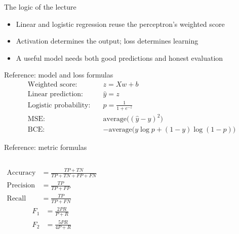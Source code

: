 \documentclass[aspectratio=169,11pt]{beamer}
\begin{document}
\begin{frame}{The logic of the lecture}
  \begin{center}
  \end{center}
  \vspace{.65cm}
  \begin{itemize}
    \item Linear and logistic regression reuse the perceptron's weighted score
    \item Activation determines the output; loss determines learning
    \item A useful model needs both good predictions and honest evaluation
  \end{itemize}
\end{frame}

\appendix
\begin{frame}{Reference: model and loss formulas}
  \begin{align*}
    \text{Weighted score:}\quad&z=Xw+b\\[4pt]
    \text{Linear prediction:}\quad&\hat y=z\\[4pt]
    \text{Logistic probability:}\quad&p=\frac{1}{1+e^{-z}}\\[4pt]
    \text{MSE:}\quad&\text{average}\big((\hat y-y)^2\big)\\[4pt]
    \text{BCE:}\quad&-\text{average}\big(y\log p+(1-y)\log(1-p)\big)
  \end{align*}
\end{frame}

\begin{frame}{Reference: metric formulas}
  \begin{columns}[T,onlytextwidth]
    \begin{align*}
      \text{Accuracy}&=\frac{TP+TN}{TP+TN+FP+FN}\\[5pt]
      \text{Precision}&=\frac{TP}{TP+FP}\\[5pt]
      \text{Recall}&=\frac{TP}{TP+FN}
    \end{align*}
    \begin{align*}
      F_1&=\frac{2PR}{P+R}\\[5pt]
      F_2&=\frac{5PR}{4P+R}
    \end{align*}
  \end{columns}
\end{frame}
\end{document}
